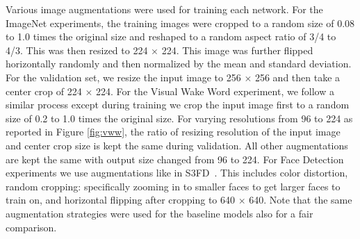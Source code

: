 \documentclass[10pt]{article}
\begin{document}
Various image augmentations were used for training each network. For
the ImageNet experiments, the training images were cropped to a random
size of 0.08 to 1.0 times the original size and reshaped to a random
aspect ratio of 3/4 to 4/3. This was then resized to 224 $\times$
224. This image was further flipped horizontally randomly and then
normalized by the mean and standard deviation. For the validation set, we
resize the input image to 256 $\times$ 256 and then take a center crop
of 224 $\times$ 224. For the Visual Wake Word experiment, we follow a
similar process except during training we crop the input image first
to a random size of 0.2 to 1.0 times the original size. For varying
resolutions from 96 to 224 as reported in Figure \ref{fig:vww}, the
ratio of resizing resolution of the input image and center crop size is kept
the same during validation. All other augmentations are kept the same with
output size changed from 96 to 224. For Face Detection experiments we
use augmentations like in S3FD~\citep{zhang2017s3fd}. This includes
color distortion, random cropping: specifically zooming in to
smaller faces to get larger faces to train on, and horizontal
flipping after cropping to 640 $\times$ 640. Note that the same
augmentation strategies were used for the baseline models also for
a fair comparison.
\end{document}
